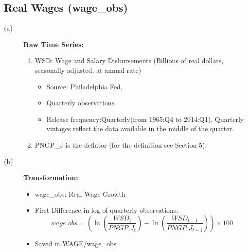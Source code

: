 \documentclass[3p,review,times]{elsarticle}		%
\begin{document}
\subsection{Real Wages (wage\_obs)}
\begin{description}
	\item[(a)] \textbf{Raw Time Series:}
	\begin{enumerate}
		\item WSD: Wage and Salary Disbursements  (Billions of real dollars, seasonally adjusted, at annual rate)
		\begin{itemize}
			\item Source: Philadelphia Fed,
			\item Quarterly observations
			\item Release frequency:Quarterly(from 1965:Q4 to 2014:Q1). Quarterly vintages reflect the data available in the middle of the quarter.
		\end{itemize}
		\item PNGP\_J is the deflator (for the definition see Section 5).
	\end{enumerate}
	
	\item[(b)] \textbf{Transformation:}
	\begin{itemize}
		\item wage\_obs:  Real Wage Growth
		\item First Difference in log of quarterly observations:
		$$wage\_obs=\left(\ln\left(\frac{WSD_t}{PNGP\_J_t}\right)-\ln\left(\frac{WSD_{t-1}}{PNGP\_J_{t-1}}\right)\right)\times 100$$
		\item Saved in WAGE/wage\_obs
	\end{itemize}
	
\end{description}
\end{document}
